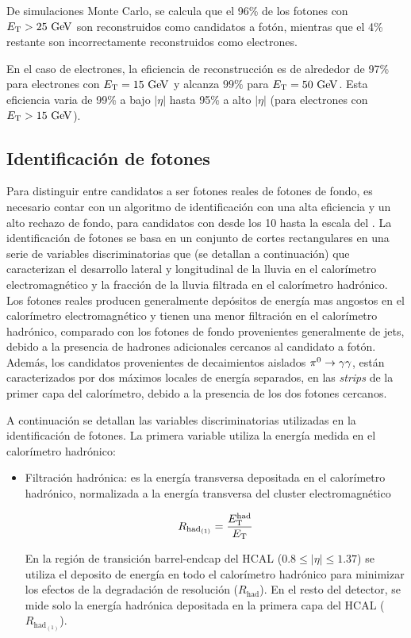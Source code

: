 De simulaciones Monte Carlo, se calcula que el 96\% de los fotones con
$\et>25\gev$ son reconstruidos como candidatos a fotón, mientras que el 4\%
restante son incorrectamente reconstruidos como electrones. %

En el caso de electrones, la eficiencia de reconstrucción es de alrededor de
97\% para electrones con $\et=15 \gev$ y alcanza $99 \%$ para $\et=50\gev$. Esta
eficiencia varia de 99\% a bajo $|\eta|$ hasta 95\% a alto $|\eta|$ (para
electrones con $\et>15 \gev$). %


\subsection{Identificación de fotones}
\label{sec:fotones}

Para distinguir entre candidatos a ser fotones reales de fotones de fondo, es
necesario contar con un algoritmo de identificación con una alta eficiencia y un alto rechazo
de fondo, para candidatos con {\et} desde los 10 {\gev} hasta la escala del
{\tev}. La identificación de fotones se basa en un conjunto de cortes
rectangulares en una serie de variables discriminatorias que (se detallan a continuación)
que caracterizan el desarrollo lateral y longitudinal de la
lluvia en el calorímetro electromagnético y la fracción de la lluvia filtrada en
el calorímetro hadrónico. Los fotones reales producen generalmente depósitos de
energía mas angostos en el calorímetro electromagnético y tienen una menor
filtración en el calorímetro hadrónico, comparado con los fotones de fondo
provenientes generalmente de jets, debido a la presencia de hadrones adicionales cercanos al
candidato a fotón. Además, los candidatos provenientes de
decaimientos aislados $\pi^0 \to \gam\gam$, están caracterizados por dos máximos
locales de energía separados, en las \emph{strips} de la primer capa del calorímetro,
debido a la presencia de los dos fotones cercanos.

A continuación se detallan las variables discriminatorias utilizadas en la identificación de fotones. La primera
 variable utiliza la energía medida en el calorímetro hadrónico:

\begin{itemize}\itemsep0.2cm\parskip0.2cm

\item Filtración hadrónica: es la energía transversa depositada en el
  calorímetro hadrónico, normalizada a la energía transversa del cluster
  electromagnético

  \begin{equation}
    R_{\mathrm{had}_{(1)}} = \frac{E_{\mathrm{T}}^{\mathrm{had}}}{E_{\mathrm{T}}}
  \end{equation}

  En la región de transición barrel-endcap del HCAL ($0.8\leq |\eta| \leq 1.37$) se utiliza
  el deposito de energía en todo el calorímetro hadrónico para minimizar los efectos de la
  degradación de resolución ($R_{\mathrm{had}}$). En el resto del detector, se mide solo la
  energía hadrónica depositada en la primera capa del HCAL ($R_{\mathrm{had}_{(1)}}$).
\end{itemize}

